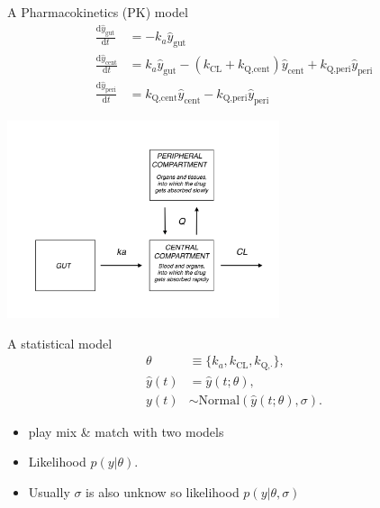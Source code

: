 \documentclass[bigger]{beamer}
\begin{document}
\begin{frame}[label={sec:org7c04983}]{A Pharmacokinetics (PK) model}
\begin{align*}
  \frac{\mathrm d \hat{y}_\mathrm{gut}}{\mathrm d t} & = - k_a \hat{y}_\mathrm{gut} \\
  \frac{\mathrm d \hat{y}_\mathrm{cent}}{\mathrm d t} & = k_a \hat{y}_\mathrm{gut} -\left (k_{\text{CL}} + k_{\text{Q,cent}} \right) \hat{y}_\mathrm{cent} + k_{\text{Q,peri}} \hat{y}_\mathrm{peri} \\
  \frac{\mathrm d \hat{y}_\mathrm{peri}}{\mathrm d t} & = k_{\text{Q,cent}} \hat{y}_\mathrm{cent} - k_{\text{Q,peri}} \hat{y}_\mathrm{peri}
\end{align*}

\begin{center}
\includegraphics[width=0.6\textwidth]{./figure/TwoCptNice.png}
\end{center}
\end{frame}

\begin{frame}[label={sec:org0f72ff1}]{A statistical model}
\begin{align*}
\theta & \equiv \{k_a, k_{\text{CL}}, k_{\text{Q,}\cdot}\},\\
\hat{y}(t) & = \hat{y}(t;\theta),\\
y(t) &\sim \text{Normal}(\hat{y}(t;\theta), \sigma).
\end{align*}

\begin{itemize}
\item play mix \& match with two models
\item Likelihood \(p(y | \theta)\).
\item Usually \(\sigma\) is also unknow so likelihood \(p(y | \theta, \sigma)\)
\end{itemize}
\end{frame}
\end{document}
